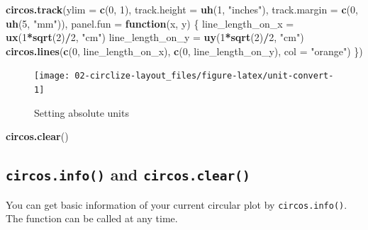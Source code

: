 \documentclass[]{book}
\newenvironment{Shaded}{\begin{snugshade}}{\end{snugshade}}
\newcommand{\KeywordTok}[1]{\textcolor[rgb]{0.13,0.29,0.53}{\textbf{#1}}}
\newcommand{\DataTypeTok}[1]{\textcolor[rgb]{0.13,0.29,0.53}{#1}}
\newcommand{\DecValTok}[1]{\textcolor[rgb]{0.00,0.00,0.81}{#1}}
\newcommand{\StringTok}[1]{\textcolor[rgb]{0.31,0.60,0.02}{#1}}
\newcommand{\ControlFlowTok}[1]{\textcolor[rgb]{0.13,0.29,0.53}{\textbf{#1}}}
\newcommand{\OperatorTok}[1]{\textcolor[rgb]{0.81,0.36,0.00}{\textbf{#1}}}
\newcommand{\NormalTok}[1]{#1}
\theoremstyle{definition}
\theoremstyle{definition}
\theoremstyle{remark}
\begin{document}
\begin{Shaded}
\begin{Highlighting}[]
\KeywordTok{circos.track}\NormalTok{(}\DataTypeTok{ylim =} \KeywordTok{c}\NormalTok{(}\DecValTok{0}\NormalTok{, }\DecValTok{1}\NormalTok{), }\DataTypeTok{track.height =} \KeywordTok{uh}\NormalTok{(}\DecValTok{1}\NormalTok{, }\StringTok{"inches"}\NormalTok{),}
    \DataTypeTok{track.margin =} \KeywordTok{c}\NormalTok{(}\DecValTok{0}\NormalTok{, }\KeywordTok{uh}\NormalTok{(}\DecValTok{5}\NormalTok{, }\StringTok{"mm"}\NormalTok{)),}
    \DataTypeTok{panel.fun =} \ControlFlowTok{function}\NormalTok{(x, y) \{}
\NormalTok{        line_length_on_x =}\StringTok{ }\KeywordTok{ux}\NormalTok{(}\DecValTok{1}\OperatorTok{*}\KeywordTok{sqrt}\NormalTok{(}\DecValTok{2}\NormalTok{)}\OperatorTok{/}\DecValTok{2}\NormalTok{, }\StringTok{"cm"}\NormalTok{)}
\NormalTok{        line_length_on_y =}\StringTok{ }\KeywordTok{uy}\NormalTok{(}\DecValTok{1}\OperatorTok{*}\KeywordTok{sqrt}\NormalTok{(}\DecValTok{2}\NormalTok{)}\OperatorTok{/}\DecValTok{2}\NormalTok{, }\StringTok{"cm"}\NormalTok{)}
        \KeywordTok{circos.lines}\NormalTok{(}\KeywordTok{c}\NormalTok{(}\DecValTok{0}\NormalTok{, line_length_on_x), }\KeywordTok{c}\NormalTok{(}\DecValTok{0}\NormalTok{, line_length_on_y), }\DataTypeTok{col =} \StringTok{"orange"}\NormalTok{)}
\NormalTok{    \})}
\end{Highlighting}
\end{Shaded}

\begin{figure}

{\centering \texttt{[image: 02-circlize-layout\_files/figure-latex/unit-convert-1]} 

}

\caption{Setting absolute units}\label{fig:unit-convert}
\end{figure}

\begin{Shaded}
\begin{Highlighting}[]
\KeywordTok{circos.clear}\NormalTok{()}
\end{Highlighting}
\end{Shaded}

\subsection{\texorpdfstring{\texttt{circos.info()} and
\texttt{circos.clear()}}{circos.info() and circos.clear()}}\label{circos-info-and-circos-clear}

You can get basic information of your current circular plot by
\texttt{circos.info()}. The function can be called at any time.
\end{document}
